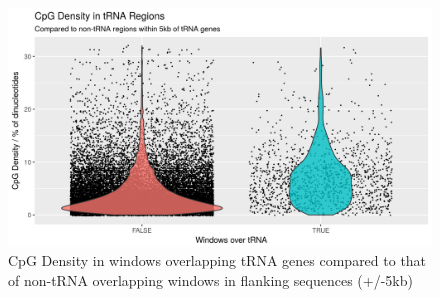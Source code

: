 \documentclass[]{book}
\begin{document}
\begin{figure}

{\centering \includegraphics[width=1\linewidth]{figs/CpGcountBGvstRNAPlot} 

}

\caption{CpG Density in windows overlapping tRNA genes compared to that of non-tRNA overlapping windows in flanking sequences (+/-5kb)}\label{fig:CpGcountBGvstRNAPlot}
\end{figure}
\end{document}
